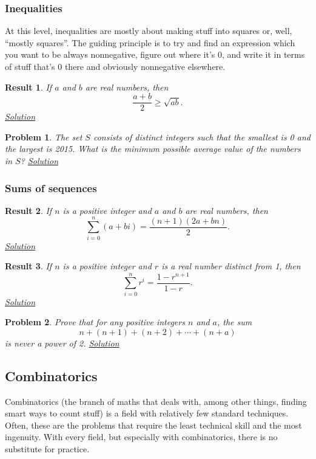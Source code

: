 \documentclass{amsart}
\newtheorem{problem}{Problem}[subsubsection]
\newtheorem{result}{Result}[subsubsection]
\begin{document}
\subsubsection{Inequalities}
At this level, inequalities are mostly about making stuff into squares or, well,
``mostly squares''. The guiding principle is to try and find an expression which
you want to be always nonnegative, figure out where it's 0, and write it in
terms of stuff that's 0 there and obviously nonnegative elsewhere.

\begin{result}\label{r:b:a:ineq:1}
  If $a$ and $b$ are real numbers, then \[\frac{a+b}2\ge\sqrt{ab}.\]
  \hyperlink{sr:b:a:ineq:1}{Solution}
\end{result}

\begin{problem}\label{p:b:a:ineq:1}
  The set $S$ consists of distinct integers such that the smallest is 0 and the
  largest is 2015. What is the minimum possible average value of the numbers in
  $S$?
  \hyperlink{sp:b:a:ineq:1}{Solution}
\end{problem}
\subsubsection{Sums of sequences}
\begin{result}\label{r:b:a:sums:1}
  If $n$ is a positive integer and $a$ and $b$ are real numbers, then
  \[\sum_{i=0}^n(a+bi)=\frac{(n+1)(2a+bn)}2.\]
  \hyperlink{sr:b:a:sums:1}{Solution}
\end{result}
\begin{result}\label{r:b:a:sums:2}
  If $n$ is a positive integer and $r$ is a real number distinct from 1, then
  \[\sum_{i=0}^n r^i=\frac{1-r^{n+1}}{1-r}.\]
  \hyperlink{sr:b:a:sums:2}{Solution}
\end{result}
\begin{problem}\label{p:b:a:sums:1}
  Prove that for any positive integers $n$ and $a$, the sum
  \[n+(n+1)+(n+2)+\cdots+(n+a)\] is never a power of 2.
  \hyperlink{sp:b:a:sums:1}{Solution}
\end{problem}
\subsection{Combinatorics}
Combinatorics (the branch of maths that deals with, among other things, finding
smart ways to count stuff) is a field with relatively few standard techniques.
Often, these are the problems that require the least technical skill and the
most ingenuity. With every field, but especially with combinatorics, there is no
substitute for practice.
\end{document}
